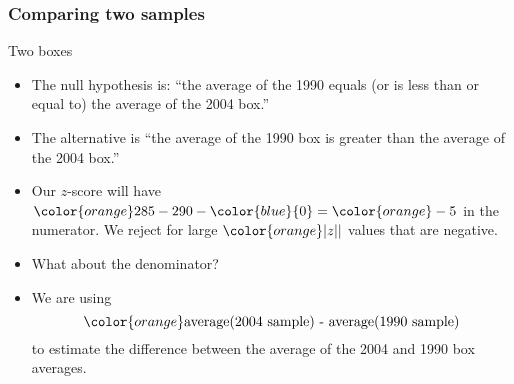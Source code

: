 \documentclass[handout]{beamer}
\begin{document}
   \begin{frame} \frametitle{Comparing two samples}

   \begin{block}
   {Two boxes}
   \begin{itemize}
   \item The null hypothesis is: {\color{blue} ``the average of the 1990 equals   (or is less than or equal to) the
   average of the 2004 box.''}

   \item The alternative is {\color{blue} ``the average of the 1990 box is greater than the  average of the 2004 box.''}

   \item Our {\color{orange} $z$-score} will have ${\color{orange}285-290}-{\color{blue}{0}}={\color{orange} -5}$ in the numerator. We reject for large ${\color{orange} |z||}$ values that are negative.

   \item What about the denominator?

   \item We are using
   $$
   {\color{orange} \text{average(2004 sample) - average(1990 sample)}}
   $$
   to estimate the difference between the average
   of the 2004 and 1990 box averages.


   \end{itemize}
   \end{block}
   \end{frame}

\end{document}

